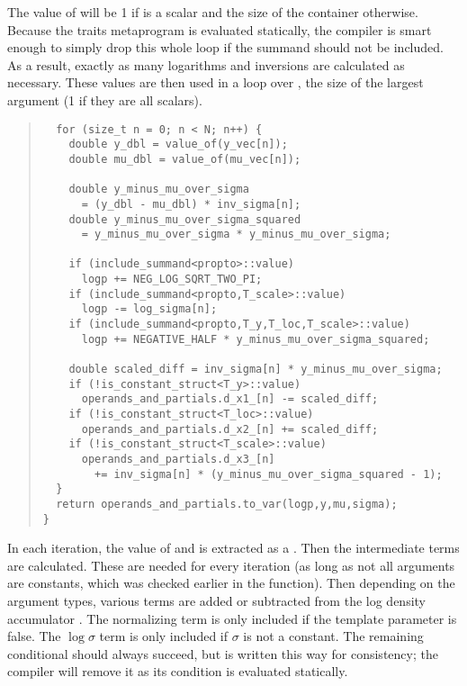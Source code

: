 \documentclass[10pt]{article}
\begin{document}
%
The value of  will be 1 if  is a
scalar and the size of the container otherwise.  Because the
 traits metaprogram is evaluated statically,
the compiler is smart enough to simply drop this whole loop if the
summand should not be included.  As a result, exactly as many
logarithms and inversions are calculated as necessary.  These values
are then used in a loop over , the size of the largest
argument (1 if they are all scalars).
%
\begin{quote}
\begin{Verbatim}
  for (size_t n = 0; n < N; n++) {
    double y_dbl = value_of(y_vec[n]);
    double mu_dbl = value_of(mu_vec[n]);

    double y_minus_mu_over_sigma 
      = (y_dbl - mu_dbl) * inv_sigma[n];
    double y_minus_mu_over_sigma_squared 
      = y_minus_mu_over_sigma * y_minus_mu_over_sigma;

    if (include_summand<propto>::value)
      logp += NEG_LOG_SQRT_TWO_PI;
    if (include_summand<propto,T_scale>::value)
      logp -= log_sigma[n];
    if (include_summand<propto,T_y,T_loc,T_scale>::value)
      logp += NEGATIVE_HALF * y_minus_mu_over_sigma_squared;

    double scaled_diff = inv_sigma[n] * y_minus_mu_over_sigma;
    if (!is_constant_struct<T_y>::value)
      operands_and_partials.d_x1_[n] -= scaled_diff;
    if (!is_constant_struct<T_loc>::value)
      operands_and_partials.d_x2_[n] += scaled_diff;
    if (!is_constant_struct<T_scale>::value)
      operands_and_partials.d_x3_[n] 
        += inv_sigma[n] * (y_minus_mu_over_sigma_squared - 1);
  }
  return operands_and_partials.to_var(logp,y,mu,sigma);
}
\end{Verbatim}
\end{quote}
%
In each iteration, the value of  and  is
extracted as a .  Then the intermediate terms are
calculated.  These are needed for every iteration (as long as not all
arguments are constants, which was checked earlier in the function).  
Then depending on the argument types, various terms are added or
subtracted from the log density accumulator .  The
normalizing term is only included if the  template
parameter is false.  The $\log \sigma$ term is only included if
$\sigma$ is not a constant.  The remaining conditional should always
succeed, but is written this way for consistency;  the compiler will
remove it as its condition is evaluated statically.
\end{document}
